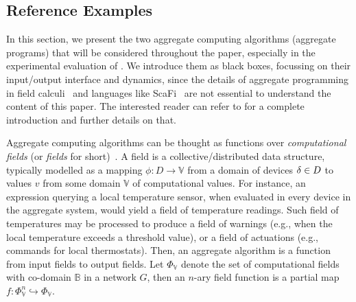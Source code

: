 \subsection{Reference Examples}
\label{s:background:ac-prog}

In this section,
 we present the two aggregate computing algorithms (aggregate programs)
 that will be considered throughout the paper,
 especially in the experimental evaluation of .
%
We introduce them as black boxes, 
 focussing on their input/output interface and dynamics,
 since the details of aggregate programming in field calculi~\cite{DBLP:journals/computer/BealPV15,DBLP:journals/jlap/ViroliBDACP19}
 and languages like ScaFi~\cite{DBLP:conf/isola/CasadeiVAD20}
 are not essential to understand the content of this paper. 
%
The interested reader can refer to \cite{DBLP:journals/jlap/ViroliBDACP19,DBLP:conf/isola/CasadeiVAD20,DBLP:journals/eaai/CasadeiVAPD21} for a complete introduction and further details on that.

Aggregate computing algorithms
 can be thought as functions
 over \emph{computational fields} (or \emph{fields} for short)~\cite{DBLP:journals/jlap/ViroliBDACP19,DBLP:journals/pervasive/MameiZL04}.
%
A field is a collective/distributed data structure,
 typically modelled as 
 a mapping $\phi: D \to \mathbb{V}$
 from a domain of devices $\delta \in D$
 to values $v$ from some domain $\mathbb{V}$ of computational values.
%
For instance,
 an expression querying a local temperature sensor,
 when evaluated in every device in the aggregate system,
 would yield a field of temperature readings.
%
Such field of temperatures may be processed
 to produce a field of warnings (e.g., when the local temperature exceeds a threshold value),
 or a field of actuations (e.g., commands for local thermostats).
%
Then,
 an aggregate algorithm
 is a function from input fields to output fields.
%
Let $\Phi_\mathbb{V}$ denote the set of computational fields with co-domain $\mathbb{B}$ in a network $G$,
 then an $n$-ary field function is a partial map
 $f: \Phi_\mathbb{V}^n \hookrightarrow \Phi_\mathbb{V}$.
 
